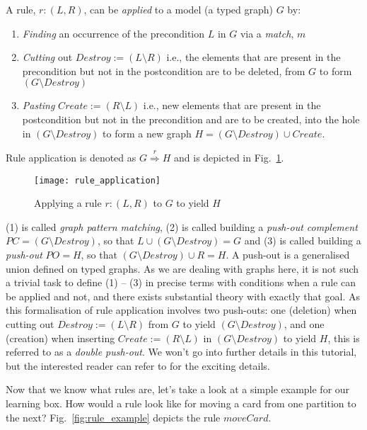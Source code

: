 A rule, $r: (L,R)$, can be \emph{applied} to a model (a typed graph) $G$ by:
\begin{enumerate}
  \item \emph{Finding} an occurrence of the precondition $L$ in $G$ via a \emph{match}, $m$
  
  \item \emph{Cutting} out $Destroy := (L\setminus R)$ i.e., the elements that are present in the precondition but not in the postcondition are to be deleted,
  from $G$ to form  $(G\setminus Destroy)$
  
  \item \emph{Pasting} $Create := (R\setminus L)$ i.e., new elements that are present in the postcondition but not in the precondition and are to be created,
  into the hole in $(G\setminus Destroy)$ to form a new graph $H = (G\setminus Destroy) \cup Create$.
\end{enumerate}

Rule application is denoted as $G \stackrel{r}{\Rightarrow} H$ and is depicted in Fig.~\ref{fig:rule_application}. 

\begin{figure}[htp]
\begin{center}
  \texttt{[image: rule\_application]}
  \caption[]{Applying a rule $r: (L,R)$ to $G$ to yield $H$} 
  \label{fig:rule_application}
\end{center}
\end{figure}

(1) is called \emph{graph pattern matching}, (2) is called building a \emph{push-out complement} $PC = (G\setminus Destroy)$, so that $L \cup(G\setminus
Destroy) = G$ and (3) is called building a \emph{push-out} $PO = H$, so that $(G\setminus Destroy) \cup R = H$.
A push-out is a generalised union defined on typed graphs.  As we are dealing with graphs here, it is not such a trivial task to define (1) -- (3) in precise
terms with conditions when a rule can be applied and not, and there exists substantial theory with exactly that goal.
As this formalisation of rule application involves two push-outs: one (deletion) when cutting out $Destroy := (L\setminus R)$ from $G$ to yield $(G\setminus
Destroy)$, and one (creation) when inserting $Create := (R\setminus L)$ in $(G\setminus Destroy)$ to yield $H$, this is referred to as a \emph{double push-out}.
We won't go into further details in this tutorial, but the interested reader can refer to \cite{EEPT06} for the exciting details.

Now that we know what rules are, let's take a look at a simple example for our learning box. How would a rule look like for moving a card from one partition to
the next?  Fig.~\ref{fig:rule_example} depicts the rule $moveCard$.
  
